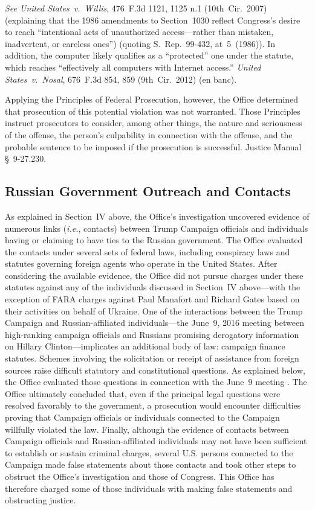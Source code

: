 \textit{See United States~v.\ Willis}, 476~F.3d 1121, 1125 n.1 (10th~Cir.~2007) (explaining that the 1986 amendments to Section~1030 reflect Congress's desire to reach ``intentional acts of unauthorized access---rather than mistaken, inadvertent, or careless ones'') (quoting S.~Rep.~99-432, at~5~(1986)).
In addition, the computer  likely qualifies as a ``protected'' one under the statute, which reaches ``effectively all computers with Internet access.''
\textit{United States~v.\ Nosal}, 676~F.3d 854, 859 (9th~Cir.~2012) (en banc).

Applying the Principles of Federal Prosecution, however, the Office determined that prosecution of this potential violation was not warranted.
Those Principles instruct prosecutors to consider, among other things, the nature and seriousness of the offense, the person's culpability in connection with the offense, and the probable sentence to be imposed if the prosecution is successful.
Justice Manual \S~9-27.230. 

\subsection{Russian Government Outreach and Contacts}
As explained in Section~IV above, the Office's investigation uncovered evidence of numerous links (\textit{i.e.}, contacts) between Trump Campaign officials and individuals having or claiming to have ties to the Russian government.
The Office evaluated the contacts under several sets of federal laws, including conspiracy laws and statutes governing foreign agents who operate in the United States.
After considering the available evidence, the Office did not pursue charges under these statutes against any of the individuals discussed in Section~IV above---with the exception of FARA charges against Paul Manafort and Richard Gates based on their activities on behalf of Ukraine.
One of the interactions between the Trump Campaign and Russian-affiliated individuals---the June~9, 2016 meeting between high-ranking campaign officials and Russians promising derogatory information on Hillary Clinton---implicates an additional body of law: campaign finance statutes.
Schemes involving the solicitation or receipt of assistance from foreign sources raise difficult statutory and constitutional questions.
As explained below, the Office evaluated those questions in connection with the June~9 meeting .
The Office ultimately concluded that, even if the principal legal questions were resolved favorably to the government, a prosecution would encounter difficulties proving that Campaign officials or individuals connected to the Campaign willfully violated the law.
Finally, although the evidence of contacts between Campaign officials and Russian-affiliated individuals may not have been sufficient to establish or sustain criminal charges, several U.S. persons connected to the Campaign made false statements about those contacts and took other steps to obstruct the Office's investigation and those of Congress.
This Office has therefore charged some of those individuals with making false statements and obstructing justice.

